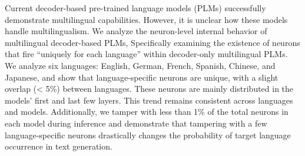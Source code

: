 Current decoder-based pre-trained language models (PLMs) successfully demonstrate multilingual capabilities.  However, it is unclear how these models handle multilingualism. We analyze the neuron-level internal behavior of multilingual decoder-based PLMs,  Specifically examining the existence of neurons that fire ``uniquely for each language'' within decoder-only multilingual PLMs. We analyze six languages: English, German, French, Spanish, Chinese, and Japanese, and show that language-specific neurons are unique, with a slight overlap (\textless{} 5\%) between languages. These neurons are mainly distributed in the models' first and last few layers.  This trend remains consistent across languages and models. Additionally, we tamper with less than 1\% of the total neurons in each model during inference and demonstrate that tampering with a few language-specific neurons drastically changes the probability of target language occurrence in text generation.